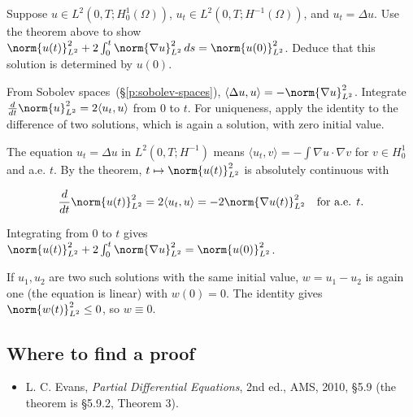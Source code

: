 \begin{exercise}
  Suppose $u \in L^2(0,T;H^1_0(\Omega))$, $u_t \in L^2(0,T;H^{-1}(\Omega))$, and $u_t = \Delta u$. Use the theorem above to show $\norm{u(t)}_{L^2}^2 + 2\int_0^t \norm{\nabla u}_{L^2}^2\,ds = \norm{u(0)}_{L^2}^2$. Deduce that this solution is determined by $u(0)$.
  \begin{hint}
    From Sobolev spaces~(\S\ref{p:sobolev-spaces}), $\langle \Delta u, u\rangle = -\norm{\nabla u}_{L^2}^2$. Integrate $\frac{d}{dt}\norm{u}_{L^2}^2 = 2\langle u_t, u\rangle$ from $0$ to $t$. For uniqueness, apply the identity to the difference of two solutions, which is again a solution, with zero initial value.
  \end{hint}
  \begin{solution}
    The equation $u_t = \Delta u$ in $L^2(0,T;H^{-1})$ means $\langle u_t, v\rangle = -\int\nabla u\cdot\nabla v$ for $v \in H^1_0$ and a.e. $t$. By the theorem, $t \mapsto \norm{u(t)}_{L^2}^2$ is absolutely continuous with

    \[ \frac{d}{dt}\norm{u(t)}_{L^2}^2 = 2\langle u_t, u\rangle = -2\norm{\nabla u(t)}_{L^2}^2 \quad\text{for a.e. } t. \]

    Integrating from $0$ to $t$ gives $\norm{u(t)}_{L^2}^2 + 2\int_0^t\norm{\nabla u}_{L^2}^2 = \norm{u(0)}_{L^2}^2$.

    If $u_1, u_2$ are two such solutions with the same initial value, $w = u_1 - u_2$ is again one (the equation is linear) with $w(0) = 0$. The identity gives $\norm{w(t)}_{L^2}^2 \le 0$, so $w \equiv 0$.
  \end{solution}
\end{exercise}

\subsection*{Where to find a proof}

\begin{itemize}
\item L. C. Evans, \emph{Partial Differential Equations}, 2nd ed., AMS, 2010, §5.9 (the theorem is §5.9.2, Theorem 3).
\end{itemize}

